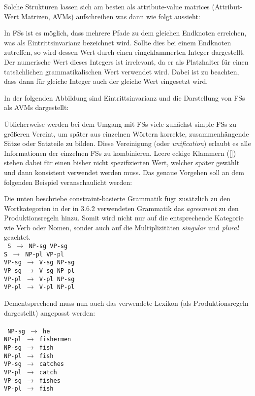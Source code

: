\documentclass[12pt]{paper}
\begin{document}
Solche Strukturen lassen sich am besten als attribute-value matrices (Attribut-Wert Matrizen, AVMs) aufschreiben was dann wie folgt aussieht:



In FSs ist es möglich, dass mehrere Pfade zu dem gleichen Endknoten erreichen, was als Eintrittsinvarianz bezeichnet wird. Sollte dies bei einem Endknoten zutreffen, so wird dessen Wert durch einen eingeklammerten Integer dargestellt. Der numerische Wert dieses Integers ist irrelevant, da er als Platzhalter für einen tatsächlichen grammatikalischen Wert verwendet wird. Dabei ist zu beachten, dass dann für gleiche Integer auch der gleiche Wert eingesetzt wird.

In der folgenden Abbildung sind Eintrittsinvarianz und die Darstellung von FSs als AVMs dargestellt:



Üblicherweise werden bei dem Umgang mit FSs viele zunächst simple FSs zu größeren Vereint, um später aus einzelnen Wörtern korrekte, zusammenhängende Sätze oder Satzteile zu bilden. Diese Vereinigung (oder \textit{unification}) erlaubt es alle Informationen der einzelnen FSs zu kombinieren. Leere eckige Klammern ([]) stehen dabei für einen bisher nicht spezifizierten Wert, welcher später gewählt und dann konsistent verwendet werden muss. Das genaue Vorgehen soll an dem folgenden Beispiel veranschaulicht werden:

Die unten beschriebe constraint-basierte Grammatik fügt zusätzlich zu den Wortkategorien in der in 3.6.2 verwendeten Grammatik das \textit{agreement} zu den Produktionsregeln hinzu. Somit wird nicht nur auf die entsprechende Kategorie wie Verb oder Nomen, sonder auch auf die Multiplizitäten \textit{singular} und \textit{plural} geachtet. \newline
\\
\tt
S $\rightarrow$ NP-sg VP-sg\\
S $\rightarrow$ NP-pl VP-pl\\
VP-sg $\rightarrow$ V-sg NP-sg\\
VP-sg $\rightarrow$ V-sg NP-pl\\
VP-pl $\rightarrow$ V-pl NP-sg\\
VP-pl $\rightarrow$ V-pl NP-pl\\
\rm

Dementsprechend muss nun auch das verwendete Lexikon (als Produktionsregeln dargestellt) angepasst werden:\\
\\
\tt
NP-sg $\rightarrow$ he\\
NP-pl $\rightarrow$ fishermen\\
NP-sg $\rightarrow$ fish\\
NP-pl $\rightarrow$ fish\\
VP-sg $\rightarrow$ catches\\
VP-pl $\rightarrow$ catch\\
VP-sg $\rightarrow$ fishes\\
VP-pl $\rightarrow$ fish\\
\rm
\end{document}
